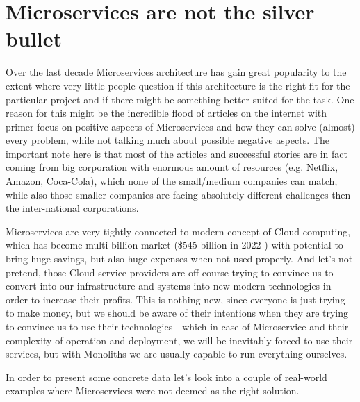 \section{Microservices are not the silver bullet}
Over the last decade Microservices architecture has gain great popularity to the extent where very little people question if this architecture is the right fit for the particular project and if there might be something better suited for the task. One reason for this might be the incredible flood of articles on the internet with primer focus on positive aspects of Microservices and how they can solve (almost) every problem, while not talking much about possible negative aspects. The important note here is that most of the articles and successful stories are in fact coming from big corporation with enormous amount of resources (e.g. Netflix, Amazon, Coca-Cola), which none of the small/medium companies can match, while also those smaller companies are facing absolutely different challenges then the inter-national corporations.

Microservices are very tightly connected to modern concept of Cloud computing, which has become multi-billion market (\$545 billion in 2022 \cite{CC_MARKET_SIZE}) with potential to bring huge savings, but also huge expenses when not used properly. And let's not pretend, those Cloud service providers are off course trying to convince us to convert into our infrastructure  and systems into new modern technologies in-order to increase their profits. This is nothing new, since everyone is just trying to make money, but we should be aware of their intentions when they are trying to convince us to use their technologies - which in case of Microservice and their complexity of operation and deployment, we will be inevitably forced to use their services, but with Monoliths we are usually capable to run everything ourselves.

In order to present some concrete data let's look into a couple of real-world examples where Microservices were not deemed as the right solution.

